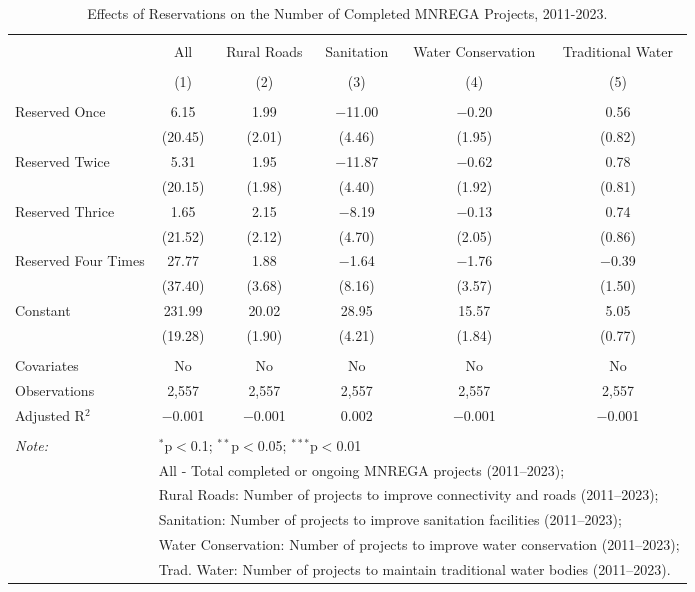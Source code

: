 
\begin{table}[!htbp] \centering 
  \caption{Effects of Reservations on the Number of Completed MNREGA Projects, 2011-2023.} 
  \label{main_mnrega_2011_2023_dosage} 
\scriptsize 
\begin{tabular}{@{\extracolsep{0pt}}lccccc} 
\\[-1.8ex]\hline 
\hline \\[-1.8ex] 
 & All & Rural Roads & Sanitation & Water Conservation & Traditional Water \\ 
\\[-1.8ex] & (1) & (2) & (3) & (4) & (5)\\ 
\hline \\[-1.8ex] 
 Reserved Once & 6.15 & 1.99 & $-$11.00 & $-$0.20 & 0.56 \\ 
  & (20.45) & (2.01) & (4.46) & (1.95) & (0.82) \\ 
  Reserved Twice & 5.31 & 1.95 & $-$11.87 & $-$0.62 & 0.78 \\ 
  & (20.15) & (1.98) & (4.40) & (1.92) & (0.81) \\ 
  Reserved Thrice & 1.65 & 2.15 & $-$8.19 & $-$0.13 & 0.74 \\ 
  & (21.52) & (2.12) & (4.70) & (2.05) & (0.86) \\ 
  Reserved Four Times & 27.77 & 1.88 & $-$1.64 & $-$1.76 & $-$0.39 \\ 
  & (37.40) & (3.68) & (8.16) & (3.57) & (1.50) \\ 
  Constant & 231.99 & 20.02 & 28.95 & 15.57 & 5.05 \\ 
  & (19.28) & (1.90) & (4.21) & (1.84) & (0.77) \\ 
 \hline \\[-1.8ex] 
Covariates & No & No & No & No & No \\ 
Observations & 2,557 & 2,557 & 2,557 & 2,557 & 2,557 \\ 
Adjusted R$^{2}$ & $-$0.001 & $-$0.001 & 0.002 & $-$0.001 & $-$0.001 \\ 
\hline 
\hline \\[-1.8ex] 
\textit{Note:}  & \multicolumn{5}{l}{$^{*}$p$<$0.1; $^{**}$p$<$0.05; $^{***}$p$<$0.01} \\ 
 & \multicolumn{5}{l}{All - Total completed or ongoing MNREGA projects (2011--2023);} \\ 
 & \multicolumn{5}{l}{Rural Roads: Number of projects to improve connectivity and roads (2011--2023);} \\ 
 & \multicolumn{5}{l}{Sanitation:  Number of projects to improve sanitation facilities  (2011--2023);} \\ 
 & \multicolumn{5}{l}{Water Conservation: Number of projects to improve water conservation (2011--2023);} \\ 
 & \multicolumn{5}{l}{Trad. Water: Number of projects to maintain traditional water bodies (2011--2023).} \\ 
\end{tabular} 
\end{table} 

